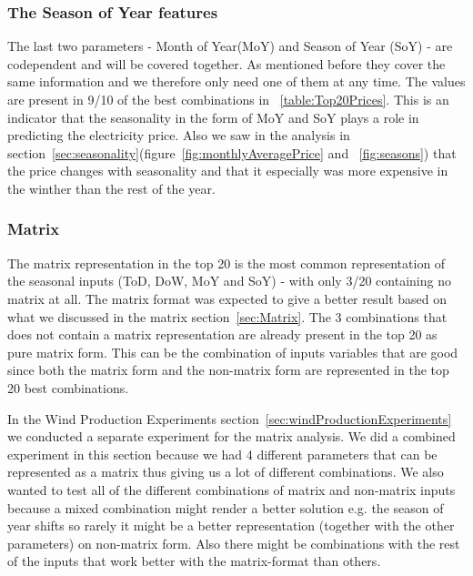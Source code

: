 \subsubsection{The Season of Year features}
The last two parameters - Month of Year(MoY) and Season of Year (SoY) - are codependent and will be covered together. As mentioned before they cover the same information and we therefore only need one of them at any time. The values are present in 9/10 of the best combinations in ~\ref{table:Top20Prices}. This is an indicator that the seasonality in the form of MoY and SoY plays a role in predicting the electricity price. Also we saw in the analysis in section~\ref{sec:seasonality}(figure~\ref{fig:monthlyAveragePrice} and ~\ref{fig:seasons}) that the price changes with seasonality and that it especially was more expensive in the winther than the rest of the year.

\subsubsection{Matrix}
The matrix representation in the top 20 is the most common representation of the seasonal inputs (ToD, DoW, MoY and SoY) - with only 3/20 containing no matrix at all. The matrix format was expected to give a better result based on what we discussed in the matrix section~\ref{sec:Matrix}. The 3 combinations that does not contain a matrix representation are already present in the top 20 as pure matrix form. This can be the combination of inputs variables that are good since both the matrix form and the non-matrix form are represented in the top 20 best combinations.

In the Wind Production Experiments section~\ref{sec:windProductionExperiments} we conducted a separate experiment for the matrix analysis. We did a combined experiment in this section because we had 4 different parameters that can be represented as a matrix thus giving us a lot of different combinations. We also wanted to test all of the different combinations of matrix and non-matrix inputs because a mixed combination might render a better solution e.g. the season of year shifts so rarely it might be a better representation (together with the other parameters) on non-matrix form. Also there might be combinations with the rest of the inputs that work better with the matrix-format than others.

